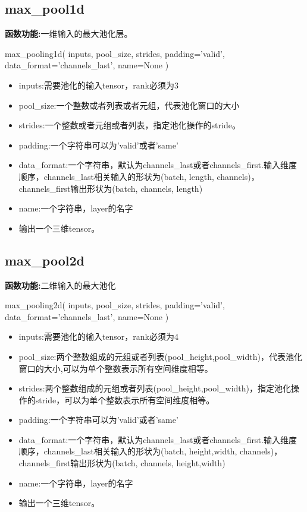 \subsection{max\_pool1d}
\textbf{函数功能:}一维输入的最大池化层。

\begin{python}
max_pooling1d(
    inputs,
    pool_size,
    strides,
    padding='valid',
    data_format='channels_last',
    name=None
)
\end{python}
\begin{itemize}
\item inputs:需要池化的输入tensor，rank必须为3
\item pool\_size:一个整数或者列表或者元组，代表池化窗口的大小
\item strides:一个整数或者元组或者列表，指定池化操作的stride。
\item padding:一个字符串可以为'valid'或者'same'
\item data\_format:一个字符串，默认为channels\_last或者channels\_first.输入维度顺序，channels\_last相关输入的形状为(batch, length, channels)，channels\_first输出形状为(batch, channels, length)
\item name:一个字符串，layer的名字
\item 输出一个三维tensor。
\end{itemize}
\subsection{max\_pool2d}
\textbf{函数功能:}二维输入的最大池化

\begin{python}
max_pooling2d(
    inputs,
    pool_size,
    strides,
    padding='valid',
    data_format='channels_last',
    name=None
)
\end{python}
\begin{itemize}
\item inputs:需要池化的输入tensor，rank必须为4
\item pool\_size:两个整数组成的元组或者列表(pool\_height,pool\_width)，代表池化窗口的大小,可以为单个整数表示所有空间维度相等。
\item strides:两个整数组成的元组或者列表(pool\_height,pool\_width)，指定池化操作的stride，可以为单个整数表示所有空间维度相等。
\item padding:一个字符串可以为'valid'或者'same'
\item data\_format:一个字符串，默认为channels\_last或者channels\_first.输入维度顺序，channels\_last相关输入的形状为(batch, height,width, channels)，channels\_first输出形状为(batch, channels, height,width)
\item name:一个字符串，layer的名字
\item 输出一个三维tensor。
\end{itemize}
